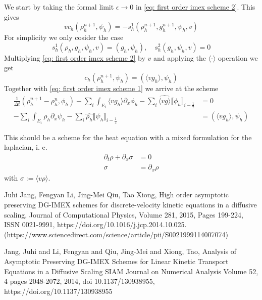\documentclass[]{article}
\begin{document}
We start by taking the formal limit $\epsilon \to 0$ in \eqref{eq: first order imex scheme 2}. This gives
\[
v c_h (\rho_h^{n+1}, \psi_h) = - s_h^1 (\rho_h^{n+1}, g_h^{n+1}, \psi_h, v)
\]
For simplicity we only cosider the case
\[
s_h^1(\rho_h, g_h, \psi_h, v) = (g_h, \psi_h), \quad s_h^2(g_h, \psi_h, v) = 0
\]
Multiplying \eqref{eq: first order imex scheme 2} by $v$ and applying the $\langle \cdot \rangle$ operation we get
\[
c_h(\rho_h^{n+1}, \psi_h) = (\langle vg_h \rangle, \psi_h)
\]
Together with \eqref{eq: first order imex scheme 1} we arrive at the scheme
\begin{align*}
	\frac{1}{\Delta t} (\rho_h^{n+1} - \rho_h^n, \phi_h) - \sum_i \int_{E_i} \langle v g_h \rangle \partial_x \phi_h - \sum_{i} \widehat{\langle v g \rangle} \llbracket \phi_h \rrbracket_{i-\frac{1}{2}} & = 0\\
	- \sum_i \int_{E_i} \rho_h \partial_x \psi_h - \sum_i \widehat{ \rho_h} \llbracket \psi_h \rrbracket_{i - \frac{1}{2}}  & = (\langle vg_h \rangle, \psi_h)
\end{align*}

This should be a scheme for the heat equation with a mixed formulation for the laplacian, i. e.
\begin{align*}
\partial_t \rho + \partial_x \sigma & = 0 \\
\sigma & = \partial_x \rho
\end{align*}
with $\sigma := \langle v \rho \rangle$.



\begin{thebibliography}{9}
	Juhi Jang, Fengyan Li, Jing-Mei Qiu, Tao Xiong,
	High order asymptotic preserving DG-IMEX schemes for discrete-velocity kinetic equations in a diffusive scaling,
	Journal of Computational Physics,
	Volume 281,
	2015,
	Pages 199-224,
	ISSN 0021-9991,
	https://doi.org/10.1016/j.jcp.2014.10.025.
	(https://www.sciencedirect.com/science/article/pii/S0021999114007074)
	
		Jang, Juhi and Li, Fengyan and Qiu, Jing-Mei and Xiong, Tao,
		Analysis of Asymptotic Preserving DG-IMEX Schemes for Linear Kinetic Transport Equations in a Diffusive Scaling
		SIAM Journal on Numerical Analysis
		Volume 52, 4
		pages 2048-2072,
		2014,
		doi 10.1137/130938955,
			https://doi.org/10.1137/130938955


\end{thebibliography}
\end{document}

